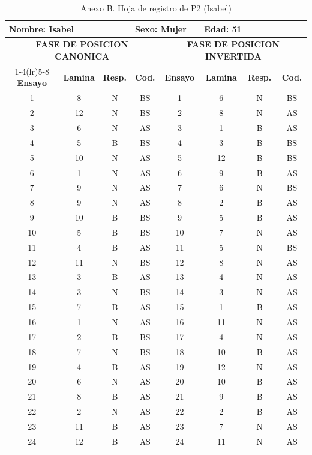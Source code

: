 \documentclass[stu, 12pt, letterpaper, donotrepeattitle, floatsintext, natbib]{apa7}
\begin{document}
\begin{table}[p]
\centering
\scriptsize
\caption{Anexo B. Hoja de registro de P2 (Isabel)}
\label{anexo:p2}
\begin{tabular}{cccccccc}
\toprule
\multicolumn{3}{l}{\textbf{Nombre:} Isabel} & \multicolumn{2}{l}{\textbf{Sexo:} Mujer} & \multicolumn{3}{l}{\textbf{Edad:} 51} \\
\midrule
\multicolumn{4}{c}{\textbf{FASE DE POSICION CANONICA}} & \multicolumn{4}{c}{\textbf{FASE DE POSICION INVERTIDA}} \\
\cmidrule(lr){1-4}\cmidrule(lr){5-8}
\textbf{Ensayo} & \textbf{Lamina} & \textbf{Resp.} & \textbf{Cod.} & \textbf{Ensayo} & \textbf{Lamina} & \textbf{Resp.} & \textbf{Cod.} \\
\midrule
1 & 8 & N & BS & 1 & 6 & N & BS \\
2 & 12 & N & BS & 2 & 8 & N & AS \\
3 & 6 & N & AS & 3 & 1 & B & AS \\
4 & 5 & B & BS & 4 & 3 & B & BS \\
5 & 10 & N & AS & 5 & 12 & B & BS \\
6 & 1 & N & AS & 6 & 9 & B & AS \\
7 & 9 & N & AS & 7 & 6 & N & BS \\
8 & 9 & N & AS & 8 & 2 & B & AS \\
9 & 10 & B & BS & 9 & 5 & B & AS \\
10 & 5 & B & BS & 10 & 7 & N & AS \\
11 & 4 & B & AS & 11 & 5 & N & BS \\
12 & 11 & N & BS & 12 & 8 & N & AS \\
13 & 3 & B & AS & 13 & 4 & N & AS \\
14 & 3 & N & BS & 14 & 3 & N & AS \\
15 & 7 & B & AS & 15 & 1 & B & AS \\
16 & 1 & N & AS & 16 & 11 & N & AS \\
17 & 2 & B & BS & 17 & 4 & N & AS \\
18 & 7 & N & BS & 18 & 10 & B & AS \\
19 & 4 & B & AS & 19 & 12 & N & AS \\
20 & 6 & N & AS & 20 & 10 & B & AS \\
21 & 8 & B & AS & 21 & 9 & B & AS \\
22 & 2 & N & AS & 22 & 2 & B & AS \\
23 & 11 & B & AS & 23 & 7 & N & AS \\
24 & 12 & B & AS & 24 & 11 & N & AS \\
\bottomrule
\end{tabular}
\end{table}
\end{document}
